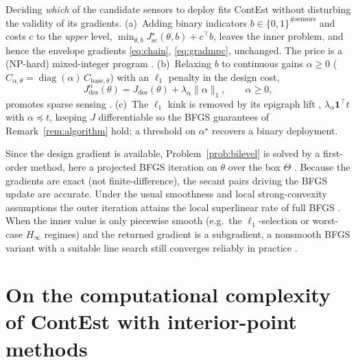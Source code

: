 \documentclass[twocolumn,amsthm]{autart}
\begin{document}
\begin{rem}\label{rem:sensor}
Deciding \emph{which} of the candidate sensors to deploy fits ContEst without
disturbing the validity of its gradients. (a)~Adding binary indicators $b\in\{0,1\}^{\#\text{sensors}}$ and
costs $c$ to the \emph{upper} level, $\min_{\theta,b}
J_{\mathrm{sc}}^\star(\theta,b)+c^\top b$, leaves the inner problem, and hence the
envelope gradients \eqref{eq:chain}, \eqref{eq:gradmpc}, unchanged. The price is a
(NP-hard) mixed-integer program \cite{joshi2009sensor,tzoumas2016sensor}.
(b)~Relaxing $b$ to continuous gains $\alpha\ge0$ ($C_{\alpha,\theta}=\operatorname{diag}(\alpha)\,C_{\mathrm{base},\theta}$) with an $\ell_1$ penalty in the design cost,
\begin{equation}\label{eq:Jdes}
J_{\mathrm{des}}^\alpha(\theta) = J_{\mathrm{des}}(\theta) + \lambda_\alpha \| \alpha \|_1,
\qquad \alpha \ge 0,
\end{equation}
promotes sparse sensing \cite{dhingra2014admm,saraf2017h2,das2017sparse}. (c)~The $\ell_1$ kink is removed
by its epigraph lift \cite{boyd2004convex}, $\lambda_\alpha \mathbf 1^\top t$ with
$\alpha\preceq t$, keeping $J$ differentiable so the BFGS guarantees of
Remark~\ref{rem:algorithm} hold; a threshold on $\alpha^\star$ recovers a binary
deployment.
\end{rem}

\begin{rem}\label{rem:algorithm}
Since the design gradient is available,
Problem~\ref{prob:bilevel} is solved by a first-order method, here a projected
BFGS iteration on $\theta$ over the box $\Theta$
\cite{nocedal2006numerical,liu1989limited}. Because the gradients are
exact (not finite-difference), the
secant pairs driving the BFGS update are accurate. Under the usual smoothness
and local strong-convexity assumptions the outer iteration attains the local
superlinear rate of full BFGS \cite{nocedal2006numerical}. When the inner value
is only piecewise smooth (e.g.\ the $\ell_1$-selection or worst-case $H_\infty$
regimes) and the returned gradient is a subgradient, a nonsmooth BFGS variant
with a suitable line search still converges reliably in practice
\cite{lewis2013nonsmooth}.
\end{rem}




\section{On the computational complexity of ContEst with interior-point methods}
\label{sec:sim:complexity}
\end{document}
